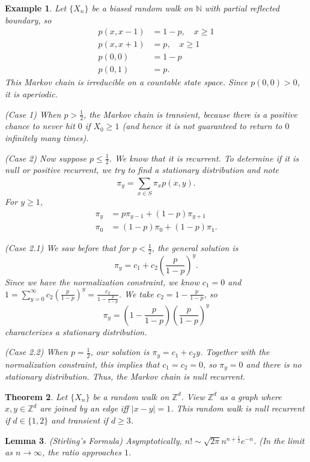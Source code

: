 \documentclass{tufte-handout}
\newcommand*\N{\mathbb{N}}
\newcommand*\Z{\mathbb{Z}}
\newtheorem{thm}{Theorem}[subsection]
\newtheorem{lemma}[thm]{Lemma}
\newtheorem{ex}[thm]{Example}
\theoremstyle{definition}
\begin{document}
\begin{ex}
	Let $\{X_n\}$ be a biased random walk on $\N$ with partial reflected boundary, so
	\begin{align*}
		p(x,x-1) &= 1-p, \quad x\ge 1\\
		p(x,x+1) &= p, \quad x \ge 1 \\
		p(0,0) &= 1-p \\
		p(0,1) &= p
	.\end{align*}
	This Markov chain is irreducible on a countable state space. Since $p(0,0) > 0$, it is aperiodic. 

	(Case 1) When $p >\frac{1}{2}$, the Markov chain is transient, because there is a positive chance to never hit $0$ if $X_0 \ge 1$ (and hence it is not guaranteed to return to $0$ infinitely many times).

	(Case 2) Now suppose $p \le \frac{1}{2}$. We know that it is recurrent. To determine if it is null or positive recurrent, we try to find a stationary distribution and note \[
		\pi_y = \sum\limits_{x \in S}^{} \pi_x p(x,y)
	.\] For $y \ge 1$,
	\begin{align*}
		\pi_y &= p \pi_{y-1} + (1-p)\pi_{y+1} \\
		\pi_0 &= (1-p)\pi_0 + (1-p)\pi_1
	.\end{align*}

	(Case 2.1) We saw before that for $p < \frac{1}{2}$, the general solution is \[
		\pi_y = c_1 + c_2 \left( \frac{p}{1-p} \right)^{y}
	.\] Since we have the normalization constraint, we know $c_1 = 0$ and $1 = \sum\limits_{y=0}^{\infty} c_2 \left( \frac{p}{1-p} \right)^{y} =  \frac{c_2}{1-\frac{p}{1-p}}$. We take $c_2 = 1 - \frac{p}{1-p}$, so \[
		\pi_y = \left( 1- \frac{p}{1-p} \right)\left( \frac{p}{1-p} \right)^y
	\] characterizes a stationary distribution.

	(Case 2.2) When $p = \frac{1}{2}$, our solution is $\pi_y = c_1 + c_2 y$. Together with the normalization constraint, this implies that $c_1=c_2=0$, so $\pi_y = 0$ and there is no stationary distribution. Thus, the Markov chain is null recurrent.
\end{ex}

\begin{thm}
	Let $\{X_n\}$ be a random walk on $\Z^{d}$. View $\Z^d$ as a graph where $x,y \in \Z^d$ are joined by an edge iff $\left| x-y \right| = 1$. This random walk is null recurrent if $d \in \{1,2\}$ and transient if $d \ge 3$.
\end{thm}

\begin{lemma}
	(Stirling's Formula) Asymptotically, $n! \sim \sqrt{2\pi} n^{n+ \frac{1}{2}} e^{-n}$. (In the limit as $n\to \infty$, the ratio approaches $1$.
\end{lemma}
\end{document}
